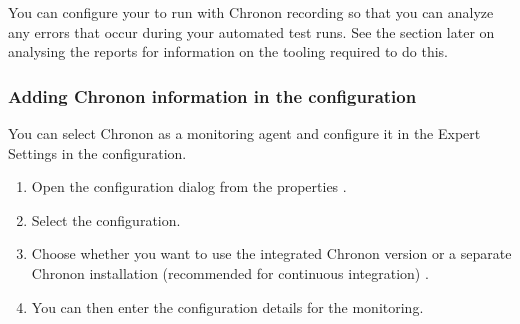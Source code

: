 
You can configure your \gdaut{} to run with Chronon recording so that you can analyze any errors that occur during your automated test runs. See the section later  on analysing the reports for information on the tooling required to do this.


\subsubsection{Adding Chronon information in the \gdaut{} configuration}
You can select Chronon as a monitoring agent and configure it in the Expert Settings in the \gdaut{} configuration. 

\begin{enumerate}
\item Open the \gdaut{} configuration dialog from the \gdproject{} properties .
\item Select the  configuration. 
\item Choose whether you want to use the integrated Chronon version  or a separate Chronon installation (recommended for continuous integration) . 
\item You can then enter the configuration details for the monitoring.
\end{enumerate}


